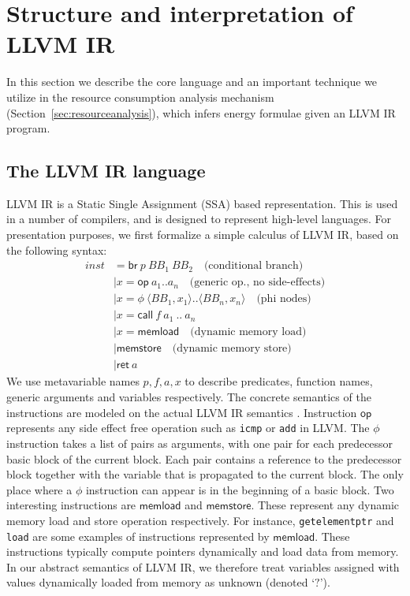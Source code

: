 \documentclass[9pt,preprint]{sigplanconf}
\newcommand{\mathspace}[1]{\ensuremath{#1}\xspace}
\newcommand{\instit}[1]{\mathspace{\mathsf{#1}}}
\newcommand{\tuple}[2]{\mathspace{\langle #1, #2 \rangle}}
\newcommand{\aBlock}{\mathspace{\mathit{BB}}}
\newcommand{\op}{\instit{op}}
\newcommand{\memload}{\instit{memload}}
\newcommand{\memstore}{\instit{memstore}}
\newcommand{\call}{\instit{call}}
\newcommand{\ret}{\instit{ret}}
\newcommand{\br}{\instit{br}}
\newcommand{\seclabel}[1]{\label{sec:#1}}
\newcommand{\secref}[1]{Section~\ref{sec:#1}}
\begin{document}
\section{Structure and interpretation of LLVM IR}
\seclabel{statLLVMIR}
In this section we describe the core language and an important technique we
utilize in the resource consumption analysis mechanism (\secref{resourceanalysis}), which
infers energy formulae given an LLVM IR program.

\subsection{The LLVM IR language}
LLVM IR is a Static Single Assignment (SSA) based representation. This is used
in a number of compilers, and is designed to represent high-level
languages. For presentation purposes, we first formalize a simple
calculus of LLVM IR, based on the following syntax:
\begin{align*}
inst &= \br~p~\aBlock_1~\aBlock_2 \quad \text{(conditional branch)}\\
     &\mid x=\op~a_1 .. a_n  \quad \text{(generic op., no side-effects)}\\
     &\mid x=\phi~\tuple{\aBlock_1}{x_1} .. \tuple{\aBlock_n}{x_n} \quad \text{(phi nodes)}\\
     &\mid x=\call~f~a_1~..~a_n\\
     &\mid x=\memload \quad \text{(dynamic memory load)}\\
     &\mid \memstore \quad \text{(dynamic memory store)}\\
     &\mid \ret~a
\end{align*}
We use metavariable names $p,f,a,x$ to describe predicates, function names,
generic arguments and variables respectively. The concrete semantics of the
instructions are modeled on the actual LLVM IR
semantics \cite{Zhao:2012:FLI:2103656.2103709}. Instruction $\op$ represents any
side effect free operation such as \texttt{icmp} or \texttt{add} in LLVM. The
$\phi$ instruction takes a
list of pairs as arguments, with one pair for each predecessor basic block of
the current block. Each pair contains a reference to the predecessor block
together with the variable that is propagated to the current block. The only
place where a $\phi$ instruction can appear is in the beginning of a basic
block. Two interesting instructions are $\memload$ and $\memstore$. These represent any
dynamic memory load and store operation respectively. For instance,
\texttt{getelementptr} and \texttt{load} are some examples of instructions
represented by $\memload$. These instructions typically compute pointers dynamically and load
data from memory. In our abstract semantics of LLVM IR, we therefore treat
variables assigned with values dynamically loaded from memory as unknown
(denoted `$?$').
\end{document}
